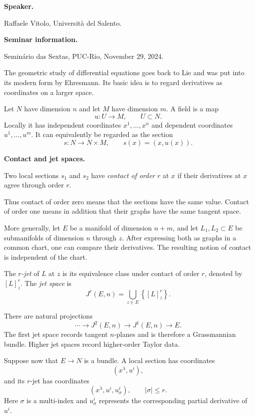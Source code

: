 \medskip\noindent
{\bf Speaker.}

Raffaele Vitolo,
Universit\`a del Salento.

\medskip\noindent
{\bf Seminar information.}

Semin\'ario das Sextas, PUC-Rio,
November 29, 2024.

The geometric study of differential
equations goes back to Lie and was put
into its modern form by Ehresmann. Its
basic idea is to regard derivatives as
coordinates on a larger space.

Let $N$ have dimension $n$ and let $M$
have dimension $m$. A field is a map
$$
u:U\longrightarrow M,
\qquad U\subset N.
$$
Locally it has independent coordinates
$x^1,\ldots,x^n$ and dependent
coordinates $u^1,\ldots,u^m$. It can
equivalently be regarded as the section
$$
s:N\longrightarrow N\times M,
\qquad s(x)=(x,u(x)).
$$

\medskip\noindent
{\bf Contact and jet spaces.}

\begin{definition}
\label{definition-contact-order}
Two local sections $s_1$ and $s_2$ have
\textit{contact of order $r$} at $x$ if
their derivatives at $x$ agree through
order $r$.
\end{definition}

Thus contact of order zero means that the
sections have the same value. Contact of
order one means in addition that their
graphs have the same tangent space.

More generally, let $E$ be a manifold of
dimension $n+m$, and let $L_1,L_2\subset E$
be submanifolds of dimension $n$ through
$z$. After expressing both as graphs in a
common chart, one can compare their
derivatives. The resulting notion of
contact is independent of the chart.

\begin{definition}
\label{definition-jet-space}
The \textit{$r$-jet} of $L$ at $z$ is its
equivalence class under contact of order
$r$, denoted by $[L]^r_z$. The
\textit{jet space} is
$$
J^r(E,n)=
\bigcup_{z\in E}
\left\{[L]^r_z\right\}.
$$
\end{definition}

There are natural projections
$$
\cdots\longrightarrow J^2(E,n)
\longrightarrow J^1(E,n)
\longrightarrow E.
$$
The first jet space records tangent
$n$-planes and is therefore a
Grassmannian bundle. Higher jet spaces
record higher-order Taylor data.

Suppose now that $E\to N$ is a bundle. A
local section has coordinates
$$
(x^\lambda,u^i),
$$
and its $r$-jet has coordinates
$$
(x^\lambda,u^i,u^i_\sigma),
\qquad |\sigma|\leq r.
$$
Here $\sigma$ is a multi-index and
$u^i_\sigma$ represents the corresponding
partial derivative of $u^i$.

